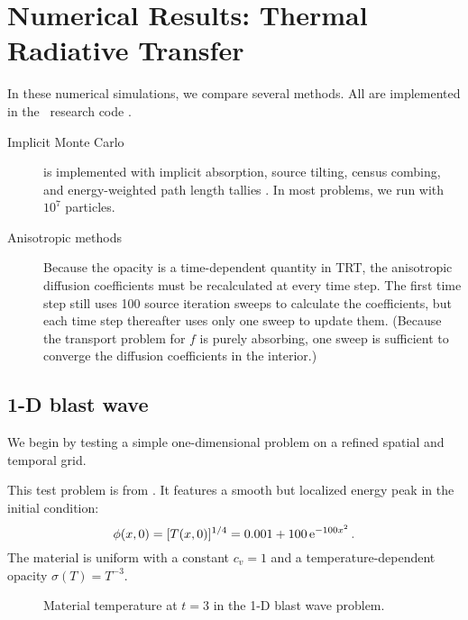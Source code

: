 
\chapter{Numerical Results: Thermal Radiative Transfer}
\label{chap:trtNumericalResults}

In these numerical simulations, we compare several methods. All
are implemented in the \pytrt\ research code \cite{Pytrt}.

\begin{description}

  \item[Implicit Monte Carlo] is implemented  with implicit
    absorption, source tilting, census combing, and
    energy-weighted path length tallies \cite{Urb2006}. In most problems, we run
    with $10^7$ particles.

  \item[Anisotropic methods] Because the opacity is a time-dependent quantity
in TRT, the anisotropic diffusion coefficients must be recalculated at every
time step. The first time step still uses 100 source iteration sweeps to
calculate the coefficients, but each time step thereafter uses only one sweep to
update them. (Because the transport problem for $f$ is purely absorbing, one
sweep is sufficient to converge the diffusion coefficients in the interior.)

\end{description}

\section{1-D blast wave}
We begin by testing a simple one-dimensional problem on a refined spatial
and temporal grid.

This test problem is from \cite{Rau2005,Ols2007}. It features a smooth but
localized energy peak in the initial condition:
\begin{equation*}
  \phi(x,0) = [T(x,0)]^{1/4} = 0.001 + 100 \mathop{}\!\mathrm{e}^{-100 x^2} \,.
\end{equation*}
The material is uniform with a constant $c_v = 1$ and a temperature-dependent
opacity $\sigma(T) = T^{-3}$.

\begin{figure}[htb]
  \centering\small
  
  \caption{Material temperature at $t=3$ in the 1-D blast wave problem.}
  \label{fig:1dblastMattemp}
\end{figure}

